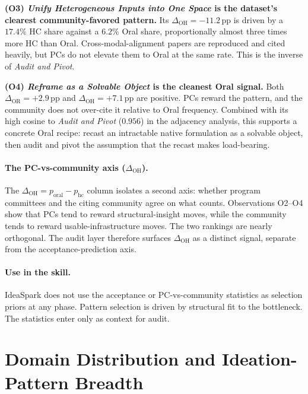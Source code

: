 \documentclass[10pt,a4paper]{article}
\begin{document}
\textbf{(O3) \emph{Unify Heterogeneous Inputs into One Space} is the dataset's clearest community-favored pattern.} Its $\Delta_{\text{OH}}{=}{-}11.2$\,pp is driven by a $17.4\%$ HC share against a $6.2\%$ Oral share, proportionally almost three times more HC than Oral. Cross-modal-alignment papers are reproduced and cited heavily, but PCs do not elevate them to Oral at the same rate. This is the inverse of \emph{Audit and Pivot}.

\textbf{(O4) \emph{Reframe as a Solvable Object} is the cleanest Oral signal.} Both $\Delta_{\text{OR}}{=}{+}2.9$\,pp and $\Delta_{\text{OH}}{=}{+}7.1$\,pp are positive. PCs reward the pattern, and the community does not over-cite it relative to Oral frequency. Combined with its high cosine to \emph{Audit and Pivot} ($0.956$) in the adjacency analysis, this supports a concrete Oral recipe: recast an intractable native formulation as a solvable object, then audit and pivot the assumption that the recast makes load-bearing.

\paragraph{The PC-vs-community axis ($\Delta_{\text{OH}}$).} The \(\Delta_{\text{OH}}{=}p_\text{oral}-p_\text{hc}\) column isolates a second axis: whether program committees and the citing community agree on what counts. Observations O2--O4 show that PCs tend to reward structural-insight moves, while the community tends to reward usable-infrastructure moves. The two rankings are nearly orthogonal. The audit layer therefore surfaces $\Delta_{\text{OH}}$ as a distinct signal, separate from the acceptance-prediction axis.

\paragraph{Use in the skill.} IdeaSpark does not use the acceptance or PC-vs-community statistics as selection priors at any phase. Pattern selection is driven by structural fit to the bottleneck. The statistics enter only as context for audit.

\section{Domain Distribution and Ideation-Pattern Breadth}
\label{sec:domains}
\end{document}
